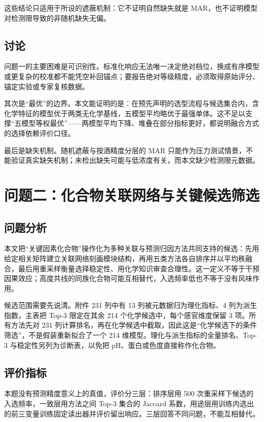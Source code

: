 \documentclass[UTF8,a4paper,zihao=-4]{ctexart}
\numberwithin{figure}{section}
\numberwithin{table}{section}
\numberwithin{equation}{section}
\begin{document}
这些结论只适用于所设的遮蔽机制：它不证明自然缺失就是 MAR，也不证明模型对检测限导致的非随机缺失无偏。

\subsection{讨论}

问题一的主要困难是可识别性。标准化响应无法唯一决定绝对档位，换成有序模型或更复杂的校准都不能凭空补回锚点；要报告绝对等级精度，必须取得原始评分、锚定实验或专家复核数据。

其次是“最优”的边界。本文能证明的是：在预先声明的选型流程与候选集合内，含化学特征的模型优于两类无化学基线，五模型平均略优于最强单体。这不足以支撑“五模型等权最优”——两模型平均下降、堆叠在部分指标更好，都说明融合方式的选择依赖评价口径。

最后是缺失机制。随机遮蔽与按酒精度分层的 MAR 只能作为压力测试情景，不能验证真实缺失机制；未检出缺失可能与低浓度有关，而本文缺少检测限元数据。%

\section{问题二：化合物关联网络与关键候选筛选}
\label{sec:q2}

\subsection{问题分析}

本文把“关键因素化合物”操作化为多种关联与预测归因方法共同支持的候选：先用给定相关矩阵建立关联网络刻画模块结构，再用五类方法各自排序并以平均秩融合，最后用重采样\cite{efron1979}衡量选择稳定性、用化学知识审查合理性。这一定义不等于干预因果效应；高度共线的同族化合物可能互相替代，入选频率低也不等于没有风味作用。

候选范围需要先说清。附件 231 列中有 13 列被元数据归为理化指标、4 列为派生指数，主表把 Top-3 限定在其余 214 个化学候选中，每个感官维度保留 3 项。所有方法先对 231 列计算排名，再在化学候选中截取，因此这是“化学候选下的条件筛选”，不是假装重新拟合了一个 214 维模型。理化与派生指标的全量排名、Top-3 与稳定性另列为诊断表，以免把 pH、蛋白或色度直接称作化合物。

\subsection{评价指标}

本题没有预测精度意义上的真值，评价分三层：排序层用 500 次重采样下候选的入选频率，一致层用方法之间 Top-3 集合的 Jaccard 系数，用途层用训练内选出的前三变量训练固定读出器并评价留出响应。三层回答不同问题，不能互相替代。
\end{document}

